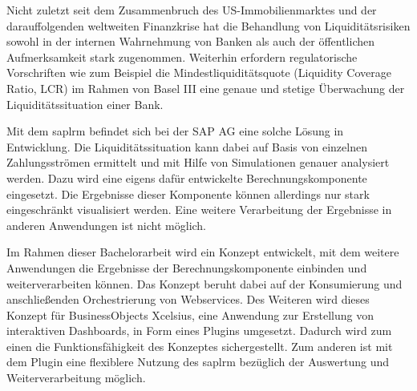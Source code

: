 \seKurzfassung{}
\begin{onehalfspacing}
Nicht zuletzt seit dem Zusammenbruch des US-Immobilienmarktes und der darauffolgenden weltweiten Finanzkrise hat die Behandlung von Liquiditätsrisiken sowohl in der internen Wahrnehmung von Banken als auch der öffentlichen Aufmerksamkeit stark zugenommen. Weiterhin erfordern regulatorische Vorschriften wie zum Beispiel die Mindestliquiditätsquote (Liquidity Coverage Ratio, LCR) im Rahmen von Basel III eine genaue und stetige Überwachung der Liquiditätssituation einer Bank.

Mit dem \gls{saplrm} befindet sich bei der SAP AG eine solche Lösung in Entwicklung. Die Liquiditätssituation kann dabei auf Basis von einzelnen Zahlungsströmen ermittelt und mit Hilfe von Simulationen genauer analysiert werden. Dazu wird eine eigens dafür entwickelte Berechnungskomponente eingesetzt. Die Ergebnisse dieser Komponente können allerdings nur stark eingeschränkt visualisiert werden. Eine weitere Verarbeitung der Ergebnisse in anderen Anwendungen ist nicht möglich.

Im Rahmen dieser Bachelorarbeit wird ein Konzept entwickelt, mit dem weitere Anwendungen die Ergebnisse der Berechnungskomponente einbinden und weiterverarbeiten können. Das Konzept beruht dabei auf der Konsumierung und anschließenden Orchestrierung von Webservices. Des Weiteren wird dieses Konzept für BusinessObjects Xcelsius, eine Anwendung zur Erstellung von interaktiven Dashboards, in Form eines Plugins umgesetzt. Dadurch wird zum einen die Funktionsfähigkeit des Konzeptes sichergestellt. Zum anderen ist mit dem Plugin eine flexiblere Nutzung des \gls{saplrm} bezüglich der Auswertung und Weiterverarbeitung möglich.

\end{onehalfspacing}
\newpage


\seInhaltsverzeichnis[
einrueckung=ja,
gliederungsebenen=4
]



